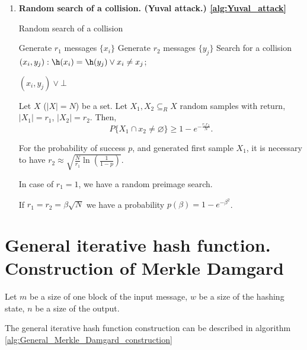 \begin{enumerate}[noitemsep]
    \item \textbf{Random search of a collision. (Yuval attack.) \ref{alg:Yuval_attack}}
        \begin{algorithm2e}[ht]
            \caption{Random search of a collision}
            \label{alg:Yuval_attack}
            

            Generate $r_1$ messages $\{x_i\}$\;
            Generate $r_2$ messages $\{y_j\}$\;
            Search for a collision $(x_i, y_j): \h(x_i) = \h(y_j) \vee x_i \neq x_j$;

            \Return $(x_i, y_j) \vee \bot$\;
        \end{algorithm2e}
        \begin{lemma}[Yuval]
            Let $X$ ($|X| = N$) be a set.
            Let $X_1, X_2 \subseteq_{R} X$ random samples with return,
            $|X_1| = r_1$, $|X_2| = r_2$. Then,
            $$P\{X_1 \cap x_2 \neq \varnothing\} \geqslant 1 - e^{- \frac{r_1 r_2}{N}}.$$
        \end{lemma}
        \begin{corollary}
            For the probability of success $p$, and generated first sample $X_1$,
            it is necessary to have $r_2 \approx \sqrt{\frac{N}{r_1} \ln(\frac{1}{1-p})}$.
        \end{corollary}
        \begin{remark}
            In case of $r_1 = 1$, we have a random preimage search.
        \end{remark}
        \begin{corollary}
            If $r_1 = r_2 = \beta \sqrt{N}$ we have a probability $p(\beta) = 1 - e^{- \beta^2}$.
        \end{corollary}
\end{enumerate}

\section{General iterative hash function. Construction of Merkle Damgard}

Let $m$ be a size of one block of the input message,
$w$ be a size of the hashing state,
$n$ be a size of the output.

The general iterative hash function construction can be described
in algorithm \ref{alg:General_Merkle_Damgard_construction}

